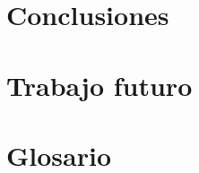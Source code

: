 \documentclass[a4paper, 11pt]{book}
\begin{document}
\begin{sloppypar}
\chapter{Conclusiones}


\chapter{Trabajo futuro}


\chapter{Glosario}






% 


% 


% 



% 
\end{sloppypar}
\end{document}
